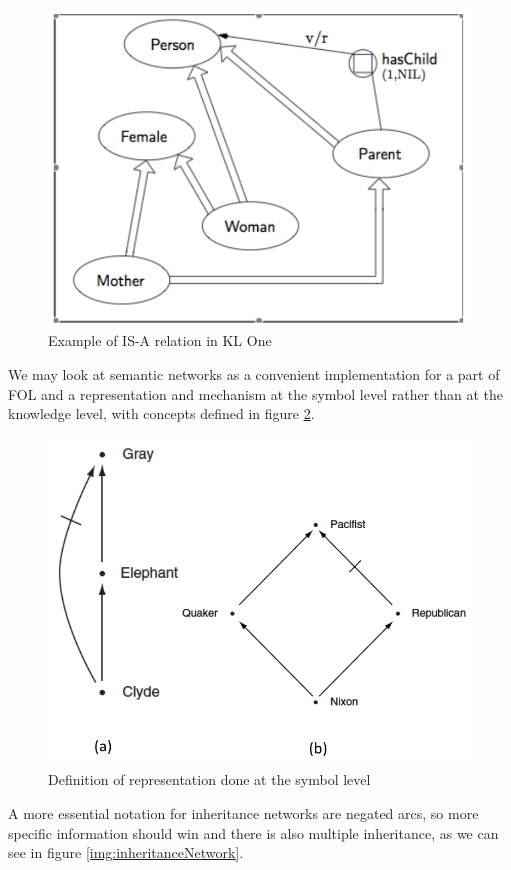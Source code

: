 \begin{figure}
	\includegraphics[width=\textwidth]{Images/klOne}
	\caption{Example of IS-A relation in KL One}
	\label{img:klOne}
\end{figure}
We may look at semantic networks as a convenient implementation for a part of
FOL and a representation and mechanism at the symbol level 
rather than at the knowledge level, with concepts defined in figure \ref{img:knowledgeConc}.

\begin{figure}
	\includegraphics[width=\textwidth]{Images/knowledgeConc}
	\caption{Definition of representation done at the symbol level}
	\label{img:knowledgeConc}
\end{figure}
A more essential notation for inheritance networks are negated arcs, so more specific
information should win and there is also multiple inheritance, as we can see in figure
\ref{img:inheritanceNetwork}.

